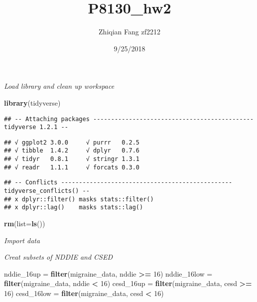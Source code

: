 \documentclass[]{article}
\title{P8130\_hw2}
\author{Zhiqian Fang zf2212}
\date{9/25/2018}
\newenvironment{Shaded}{\begin{snugshade}}{\end{snugshade}}
\newcommand{\KeywordTok}[1]{\textcolor[rgb]{0.13,0.29,0.53}{\textbf{#1}}}
\newcommand{\DataTypeTok}[1]{\textcolor[rgb]{0.13,0.29,0.53}{#1}}
\newcommand{\DecValTok}[1]{\textcolor[rgb]{0.00,0.00,0.81}{#1}}
\newcommand{\StringTok}[1]{\textcolor[rgb]{0.31,0.60,0.02}{#1}}
\newcommand{\OperatorTok}[1]{\textcolor[rgb]{0.81,0.36,0.00}{\textbf{#1}}}
\newcommand{\NormalTok}[1]{#1}
\begin{document}
\maketitle

\emph{Load library and clean up workspace}

\begin{Shaded}
\begin{Highlighting}[]
\KeywordTok{library}\NormalTok{(tidyverse)}
\end{Highlighting}
\end{Shaded}

\begin{verbatim}
## -- Attaching packages --------------------------------------------- tidyverse 1.2.1 --
\end{verbatim}

\begin{verbatim}
## √ ggplot2 3.0.0     √ purrr   0.2.5
## √ tibble  1.4.2     √ dplyr   0.7.6
## √ tidyr   0.8.1     √ stringr 1.3.1
## √ readr   1.1.1     √ forcats 0.3.0
\end{verbatim}

\begin{verbatim}
## -- Conflicts ------------------------------------------------ tidyverse_conflicts() --
## x dplyr::filter() masks stats::filter()
## x dplyr::lag()    masks stats::lag()
\end{verbatim}

\begin{Shaded}
\begin{Highlighting}[]
\KeywordTok{rm}\NormalTok{(}\DataTypeTok{list=}\KeywordTok{ls}\NormalTok{())}
\end{Highlighting}
\end{Shaded}

\emph{Import data}

\begin{Shaded}
\end{Shaded}

\emph{Creat subsets of NDDIE and CSED}

\begin{Shaded}
\begin{Highlighting}[]
\NormalTok{nddie_16up =}\StringTok{ }\KeywordTok{filter}\NormalTok{(migraine_data, nddie }\OperatorTok{>=}\StringTok{ }\DecValTok{16}\NormalTok{)}
\NormalTok{nddie_16low =}\StringTok{ }\KeywordTok{filter}\NormalTok{(migraine_data, nddie }\OperatorTok{<}\StringTok{ }\DecValTok{16}\NormalTok{)}
\NormalTok{cesd_16up =}\StringTok{ }\KeywordTok{filter}\NormalTok{(migraine_data, cesd }\OperatorTok{>=}\StringTok{ }\DecValTok{16}\NormalTok{)}
\NormalTok{cesd_16low =}\StringTok{ }\KeywordTok{filter}\NormalTok{(migraine_data, cesd }\OperatorTok{<}\StringTok{ }\DecValTok{16}\NormalTok{)}
\end{Highlighting}
\end{Shaded}
\end{document}

